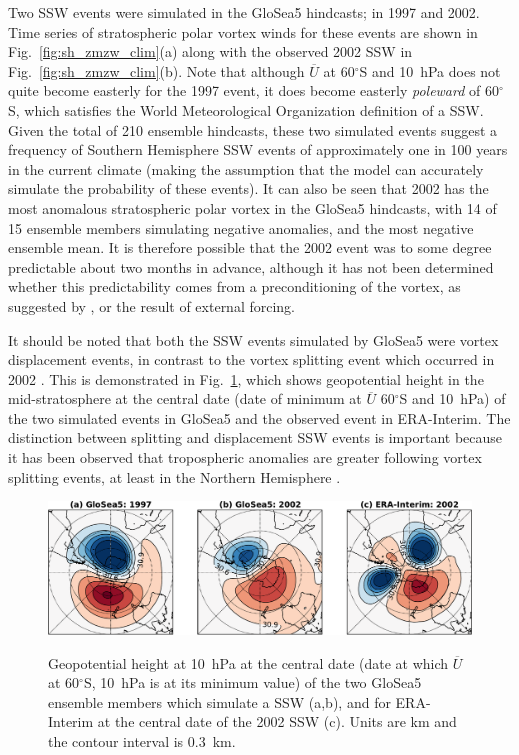 Two SSW events were simulated in the GloSea5 hindcasts; in 1997 and 2002. Time
series of stratospheric polar vortex winds for these events are shown in Fig.\
\ref{fig:sh_zmzw_clim}(a) along with the observed 2002 SSW in Fig.\
\ref{fig:sh_zmzw_clim}(b). Note that although $\overline{U}$ at 60$^{\circ}$S
and 10~hPa does not quite become easterly for the 1997 event, it does become
easterly \emph{poleward} of 60$^{\circ}$S, which satisfies the World
Meteorological Organization definition of a SSW. Given the total of 210 ensemble
hindcasts, these two simulated events suggest a frequency of Southern Hemisphere
SSW events of approximately one in 100 years in the current climate (making the
assumption that the model can accurately simulate the probability of these
events). It can also be seen that 2002 has the most anomalous stratospheric
polar vortex in the GloSea5 hindcasts, with 14 of 15 ensemble members simulating
negative anomalies, and the most negative ensemble mean. It is therefore
possible that the 2002 event was to some degree predictable about two months in
advance, although it has not been determined whether this predictability comes
from a preconditioning of the vortex, as suggested by \citet{Scaife2005c}, or
the result of external forcing.

It should be noted that both the SSW events simulated by GloSea5 were vortex
displacement events, in contrast to the vortex splitting event which occurred in
2002 \citep{Charlton2005a}. This is demonstrated in Fig.\ \ref{fig:sh_ssws}, which
shows geopotential height in the mid-stratosphere at the central date (date of
minimum at $\overline{U}$ 60$^{\circ}$S and 10~hPa) of the two simulated events
in GloSea5 and the observed event in ERA-Interim. The distinction between
splitting and displacement SSW events is important because it has been observed
that tropospheric anomalies are greater following vortex splitting events, at
least in the Northern Hemisphere \citep{Nakagawa2006, Mitchell2013}.

\begin{figure}[t]
  \noindent\includegraphics[width=\textwidth,angle=0]{figures/chapter-seasonal/ssws_crop.pdf}\\
  \caption[Comparison of GloSea5 and observed SSWs.]{Geopotential height at
10~hPa at the central date (date at which $\overline{U}$ at 60$^{\circ}$S,
10~hPa is at its minimum value) of the two GloSea5 ensemble members which
simulate a SSW (a,b), and for ERA-Interim at the central date of the 2002 SSW
(c). Units are km and the contour interval is 0.3~km.}\label{fig:sh_ssws}
\end{figure}


